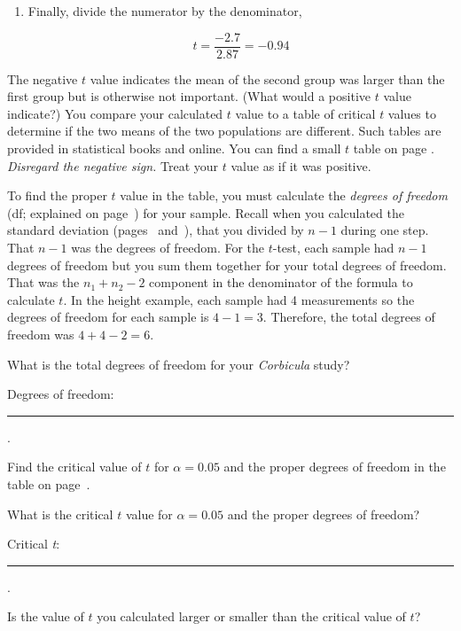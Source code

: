 \documentclass[12pt]{exam}
\newcommand*\Corbicula{\textit{Corbicula}}
\newcommand*\AnswerBlank{\rule{0.75in}{0.4pt}\kern0.67pt.}
\begin{document}
\begin{questions}
\begin{enumerate}
\newpage

\item Finally, divide the numerator by the denominator,

\begin{equation*}
	t = \frac{-2.7}{2.87} = -0.94
\end{equation*}

\end{enumerate}


The negative $t$ value indicates the mean of the second group was larger than the first group but is otherwise not important. (What would a positive $t$ value indicate?) You compare your calculated $t$ value to a table of critical $t$ values to determine if the two means of the two populations are different. Such tables are provided in statistical books and online. You can find a small $t$ table on page \pageref{tab:ttable}. \emph{Disregard the negative sign.} Treat your $t$ value as if it was positive. 

To find the proper $t$ value in the table, you must calculate the \emph{degrees of freedom} (df; explained on page~\pageref{degrees_freedom}) for your sample. Recall  when you calculated the standard deviation (pages~\pageref{tab:height_sd} and~\pageref{tab:sdA}), that you divided by $n-1$ during one step. That $n-1$ was the degrees of freedom. For the $t$-test, each sample had $n-1$ degrees of freedom but you sum them together for your total degrees of freedom. That was the $n_1 + n_2 -2$ component in the denominator of the formula to calculate $t$. In the height example, each sample had 4 measurements so the degrees of freedom for each sample is $4-1 = 3$. Therefore, the total degrees of freedom was $4 + 4 - 2 = 6$.

\question
What is the total degrees of freedom for your \Corbicula{} study? \bigskip

Degrees of freedom:  \AnswerBlank{}

\bigskip

Find the critical value of $t$ for $\alpha = 0.05$ and the proper degrees of  freedom in the table on page~\pageref{tab:ttable}. 

\question 
What is the critical $t$ value for $\alpha = 0.05$ and the proper degrees of freedom?  \bigskip

Critical \textit{t}: \AnswerBlank{}

\bigskip

\question
Is the value of $t$ you calculated larger or smaller than the critical value of $t$?


\end{questions}
\end{document}
